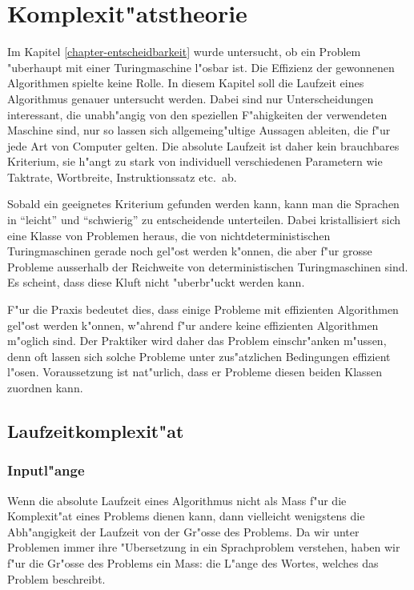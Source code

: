 %
%
%
\chapter{Komplexit"atstheorie\label{chapter-komplexitaet}}
\rhead{}
Im Kapitel \ref{chapter-entscheidbarkeit} wurde untersucht, ob ein
Problem "uberhaupt mit einer Turingmaschine l"osbar ist. Die
Effizienz der gewonnenen Algorithmen spielte keine Rolle.
In diesem Kapitel soll die Laufzeit eines Algorithmus genauer
untersucht werden. Dabei sind nur Unterscheidungen interessant,
die unabh"angig von den speziellen F"ahigkeiten der verwendeten
Maschine sind, nur so lassen sich allgemeing"ultige Aussagen
ableiten, die f"ur jede Art von Computer gelten. Die absolute Laufzeit
ist daher kein brauchbares Kriterium, sie h"angt zu stark
von individuell verschiedenen Parametern wie Taktrate, Wortbreite,
Instruktionssatz etc.~ab. 

Sobald ein geeignetes Kriterium gefunden werden kann, kann man
die Sprachen in ``leicht'' und ``schwierig'' zu entscheidende 
unterteilen. Dabei kristallisiert sich eine Klasse von
Problemen heraus, die von nichtdeterministischen Turingmaschinen
gerade noch gel"ost werden k"onnen, die aber f"ur grosse
Probleme ausserhalb der Reichweite von deterministischen Turingmaschinen
sind. Es scheint, dass diese Kluft nicht "uberbr"uckt werden kann.

F"ur die Praxis bedeutet dies, dass einige Probleme mit effizienten
Algorithmen gel"ost werden k"onnen, w"ahrend f"ur andere 
keine effizienten Algorithmen m"oglich sind. Der Praktiker wird daher
das Problem einschr"anken m"ussen, denn oft lassen sich solche
Probleme unter zus"atzlichen Bedingungen effizient l"osen.
Voraussetzung ist nat"urlich, dass er Probleme diesen beiden
Klassen zuordnen kann.

\section{Laufzeitkomplexit"at}
\subsection{Inputl"ange}
Wenn die absolute Laufzeit eines Algorithmus nicht als Mass f"ur
die Komplexit"at eines Problems dienen kann, dann vielleicht
wenigstens die Abh"angigkeit der Laufzeit von der Gr"osse des
Problems. Da wir unter Problemen immer ihre "Ubersetzung in ein
Sprachproblem verstehen, haben wir f"ur die Gr"osse des Problems
ein Mass: die L"ange des Wortes, welches das Problem beschreibt.

